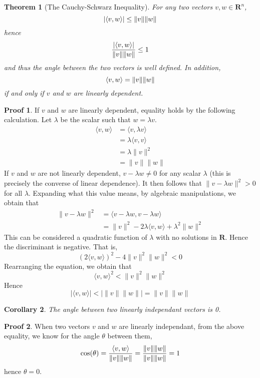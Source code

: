 \documentclass[12pt]{amsbook}
\theoremstyle{plain}
\newtheorem{theorem}{Theorem}
\newtheorem{corollary}[theorem]{Corollary}
\theoremstyle{definition}
\newtheorem*{prf}{Proof}
\DeclarePairedDelimiter{\inner}{\langle}{\rangle}
\begin{document}
\begin{theorem}[The Cauchy-Schwarz Inequality]
  For any two vectors $v,w \in \mathbf{R}^n$,
  \[ |\inner{v, w}| \leq \|v\|\|w\| \]
  hence
  \[ \frac{|\inner{v, w}|}{\|v\|\|w\|} \leq 1 \]
  and thus the angle between the two vectors is well defined. In addition,
  \[ \inner{v, w} = \|v\|\|w\| \]
  if and only if $v$ and $w$ are linearly dependent.
\end{theorem}
\begin{prf}
  If $v$ and $w$ are linearly dependent, equality holds by the following calculation. Let $\lambda$ be the scalar such that $w = \lambda v$.
  \begin{align*}
    \langle v, w \rangle &= \langle v, \lambda v \rangle\\
                         &= \lambda \langle v, v \rangle\\
                         &= \lambda \| v \|^2\\
                         &= \| v \| \| w \|
  \end{align*}
  If $v$ and $w$ are not linearly dependent, $v - \lambda w \neq 0$ for any scalar $\lambda$ (this is precisely the converse of linear dependence). It then follows that $\| v - \lambda w \|^2 > 0$ for all $\lambda$. Expanding what this value means, by algebraic manipulations, we obtain that
  \begin{align*}
    \| v - \lambda w \|^2 &= \langle v - \lambda w, v - \lambda w \rangle\\
                          &= \|v\|^2 - 2 \lambda \langle v, w \rangle + \lambda^2 \| w \|^2
  \end{align*}
  This can be considered a quadratic function of $\lambda$ with no solutions in $\mathbf{R}$. Hence the discriminant is negative. That is,
  \[ (2 \langle v, w \rangle)^2 - 4 \|v\|^2 \|w\|^2 < 0 \]
  Rearranging the equation, we obtain that
  \[ \langle v, w \rangle^2 < \|v\|^2\|w\|^2 \]
  Hence
  \[ |\langle v, w \rangle| <|\|v\|\|w\|| = \|v\|\|w\| \]
\end{prf}

\begin{corollary}
  The angle between two linearly independant vectors is 0.
\end{corollary}
\begin{prf}
  When two vectors $v$ and $w$ are linearly independant, from the above equality, we know for the angle $\theta$ between them,
  \[\cos(\theta) = \frac{\inner{v, w}}{\|v\|\|w\|} = \frac{\|v\|\|w\|}{\|v\|\|w\|} = 1\]
  hence $\theta = 0$.
\end{prf}
\end{document}
